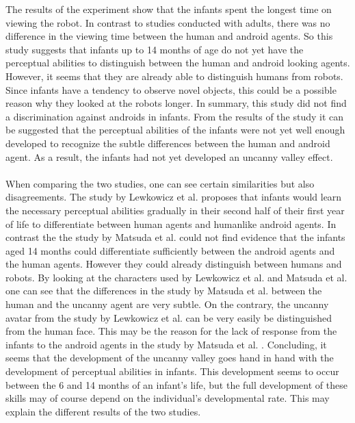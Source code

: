 The results of the experiment show that the infants spent the longest time on viewing the robot. In contrast to studies conducted with adults, there was no difference in the viewing time between the human and android agents. So this study suggests that infants up to 14 months of age do not yet have the perceptual abilities to distinguish between the human and android looking agents. However, it seems that they are already able to distinguish humans from robots. Since infants have a tendency to observe novel objects, this could be a possible reason why they looked at the robots longer. In summary, this study did not find a discrimination against androids in infants. From the results of the study it can be suggested that the perceptual abilities of the infants were not yet well enough developed to recognize the subtle differences between the human and android agent. As a result, the infants had not yet developed an uncanny valley effect.\\\\
When comparing the two studies, one can see certain similarities but also disagreements. The study by Lewkowicz et al. \cite{uncanny_infants} proposes that infants would learn the necessary perceptual abilities gradually in their second half of their first year of life to differentiate between human agents and humanlike android agents. In contrast the the study by Matsuda et al. \cite{uncanny_infant_discrimination} could not find evidence that the infants aged 14 months could differentiate sufficiently between the android agents and the human agents. However they could already distinguish between humans and robots. By looking at the characters used by Lewkowicz et al. and Matsuda et al. one can see that the differences in the study by Matsuda et al. between the human and the uncanny agent are very subtle. On the contrary, the uncanny avatar from the study by Lewkowicz et al.  can be very easily be distinguished from the human face. This may be the reason for the lack of response from the infants to the android agents in the study by Matsuda et al. . Concluding, it seems that the development of the uncanny valley goes hand in hand with the development of perceptual abilities in infants. This development seems to occur between the 6 and 14 months of an infant's life, but the full development of these skills  may of course depend on the individual's developmental rate. This may explain the different results of the two studies. 
\newpage

